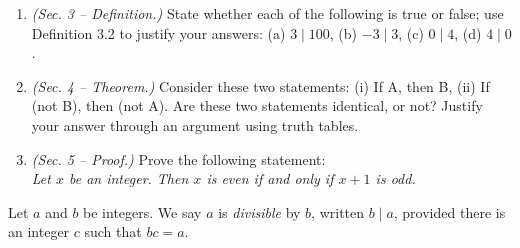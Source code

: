 \documentclass[10pt]{beamer}
\begin{document}
\begin{frame}

 \begin{myredbox}[title=Weekly Quiz] 
\begin{enumerate}
	\item  \textit{(Sec. 3 -- Definition.)}  State whether each of the following is true or false; use Definition 3.2 to justify your answers: (a) $3 \mid 100$, (b) $-3 \mid 3$, (c) $0 \mid 4$, (d) $4 \mid 0$.
	\item \textit{(Sec. 4 -- Theorem.)} Consider these two statements: (i) If A, then B, (ii) If (not B), then (not A).  Are these two statements identical, or not? Justify your answer through an argument using truth tables.
	\item \textit{(Sec. 5 -- Proof.)} Prove the following statement: \\ \textit{Let $x$ be an integer.  Then $x$ is even if and only if $x+1$ is odd.}
\end{enumerate}
\end{myredbox}

\vfill 
\begin{mygreenbox}[title=Reference Material: Scheinerman Definition 3.2] Let $a$ and $b$ be integers.  We say $a$ is \textit{divisible} by $b$, written $b \mid a$, provided there is an integer $c$ such that $bc=a$. 	
\end{mygreenbox}

\end{frame}



%
%
%
%
%
\end{document}
